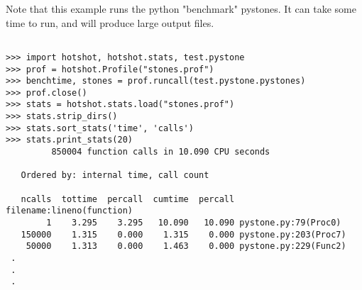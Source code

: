 Note that this example runs the python "benchmark" pystones. It can
take some time to run, and will produce large output files.

\begin{verbatim}

>>> import hotshot, hotshot.stats, test.pystone
>>> prof = hotshot.Profile("stones.prof")
>>> benchtime, stones = prof.runcall(test.pystone.pystones)
>>> prof.close()
>>> stats = hotshot.stats.load("stones.prof")
>>> stats.strip_dirs()
>>> stats.sort_stats('time', 'calls')
>>> stats.print_stats(20)
         850004 function calls in 10.090 CPU seconds

   Ordered by: internal time, call count

   ncalls  tottime  percall  cumtime  percall filename:lineno(function)
        1    3.295    3.295   10.090   10.090 pystone.py:79(Proc0)
   150000    1.315    0.000    1.315    0.000 pystone.py:203(Proc7)
    50000    1.313    0.000    1.463    0.000 pystone.py:229(Func2)
 .
 .
 .

\end{verbatim}


